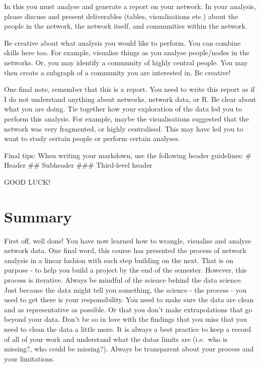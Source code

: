 \documentclass[
  letterpaper,
  DIV=11,
  numbers=noendperiod]{scrreprt}
\begin{document}
In this you must analyse and generate a report on your network. In your
analysis, please discuss and present deliverables (tables,
visualisations etc.) about the people in the network, the network
itself, and communities within the network.

Be creative about what analysis you would like to perform. You can
combine skills here too. For example, visualise things as you analyse
people/nodes in the networks. Or, you may identify a community of highly
central people. You may then create a subgraph of a community you are
interested in. Be creative!

One final note, remember that this is a report. You need to write this
report as if I do not understand anything about networks, network data,
or R. Be clear about what you are doing. Tie together how your
exploration of the data led you to perform this analysis. For example,
maybe the visualisations suggested that the network was very fragmented,
or highly centralised. This may have led you to want to study certain
people or perform certain analyses.

Final tips: When writing your markdown, use the following header
guidelines: \# Header \#\# Subheader \#\#\# Third-level header

GOOD LUCK!


\chapter{Summary}\label{summary-9}

First off, well done! You have now learned how to wrangle, visualise and
analyse network data. One final word, this course has presented the
process of network analysis in a linear fashion with each step building
on the next. That is on purpose - to help you build a project by the end
of the semester. However, this process is iterative. Always be mindful
of the science behind the data science. Just because the data might tell
you something, the science - the process - you used to get there is your
responsibility. You need to make sure the data are clean and as
representative as possible. Or that you don't make extrapolations that
go beyond your data. Don't be so in love with the findings that you miss
that you need to clean the data a little more. It is always a best
practice to keep a record of all of your work and understand what the
datas limits are (i.e.~who is missing?, who could be missing?). Always
be transparent about your process and your limitations.
\end{document}
